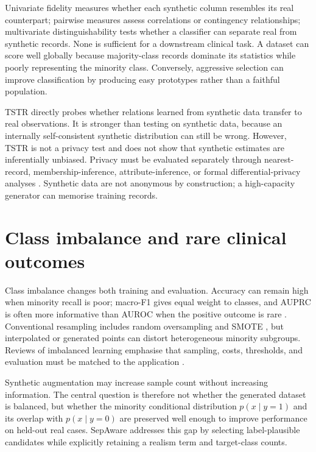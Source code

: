 Univariate fidelity measures whether each synthetic column resembles its real counterpart; pairwise measures assess correlations or contingency relationships; multivariate distinguishability tests whether a classifier can separate real from synthetic records. None is sufficient for a downstream clinical task. A dataset can score well globally because majority-class records dominate its statistics while poorly representing the minority class. Conversely, aggressive selection can improve classification by producing easy prototypes rather than a faithful population.

TSTR directly probes whether relations learned from synthetic data transfer to real observations. It is stronger than testing on synthetic data, because an internally self-consistent synthetic distribution can still be wrong. However, TSTR is not a privacy test and does not show that synthetic estimates are inferentially unbiased. Privacy must be evaluated separately through nearest-record, membership-inference, attribute-inference, or formal differential-privacy analyses \citep{yale2019,dwork2006}. Synthetic data are not anonymous by construction; a high-capacity generator can memorise training records.

\section{Class imbalance and rare clinical outcomes}

Class imbalance changes both training and evaluation. Accuracy can remain high when minority recall is poor; macro-F1 gives equal weight to classes, and AUPRC is often more informative than AUROC when the positive outcome is rare \citep{saito2015}. Conventional resampling includes random oversampling and SMOTE \citep{chawla2002}, but interpolated or generated points can distort heterogeneous minority subgroups. Reviews of imbalanced learning emphasise that sampling, costs, thresholds, and evaluation must be matched to the application \citep{he2009}.

Synthetic augmentation may increase sample count without increasing information. The central question is therefore not whether the generated dataset is balanced, but whether the minority conditional distribution $p(x\mid y=1)$ and its overlap with $p(x\mid y=0)$ are preserved well enough to improve performance on held-out real cases. SepAware addresses this gap by selecting label-plausible candidates while explicitly retaining a realism term and target-class counts.

